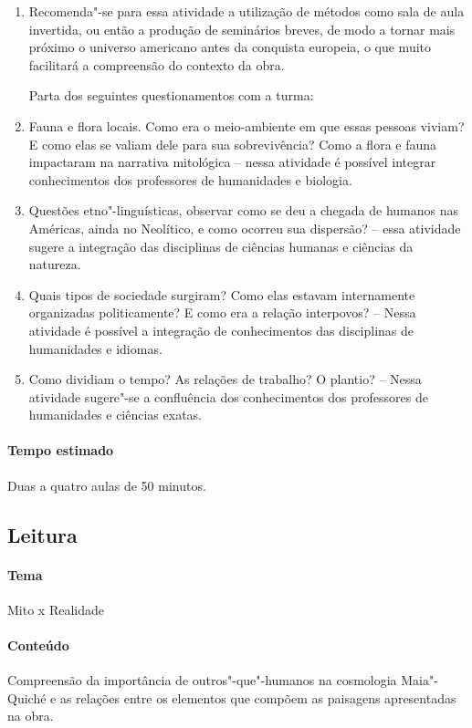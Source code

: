\documentclass[11pt]{extarticle}
\begin{document}
\begin{enumerate}
\item 
Recomenda"-se para essa atividade a utilização de métodos como sala de
aula invertida, ou então a produção de seminários breves, de modo a
tornar mais próximo o universo americano antes da conquista europeia, o
que muito facilitará a compreensão do contexto da obra.

Parta dos seguintes questionamentos com a turma:

\item
Fauna e flora locais. Como era o meio-ambiente em que essas pessoas
viviam? E como elas se valiam dele para sua sobrevivência? Como a
flora e fauna impactaram na narrativa mitológica -- nessa atividade é
possível integrar conhecimentos dos professores de humanidades e biologia.

\item
Questões etno"-linguísticas, observar como se deu a chegada de humanos
nas Américas, ainda no Neolítico, e como ocorreu sua dispersão? --
essa atividade sugere a integração das disciplinas de ciências humanas 
e ciências da natureza.
\item
Quais tipos de sociedade surgiram? Como elas estavam internamente
organizadas politicamente? E como era a relação interpovos? -- Nessa
atividade é possível a integração de conhecimentos das disciplinas de 
humanidades e idiomas.

\item
Como dividiam o tempo? As relações de trabalho? O plantio? -- Nessa 
atividade sugere"-se a confluência dos conhecimentos dos professores de 
humanidades e ciências exatas.

\end{enumerate}

\paragraph{Tempo estimado} Duas a quatro aulas de 50 minutos. 

\subsection{Leitura} 

\paragraph{Tema} Mito x Realidade

\paragraph{Conteúdo} Compreensão da importância de outros"-que"-humanos na cosmologia
Maia"-Quiché e as relações entre os elementos que compõem as paisagens apresentadas na obra. 
\end{document}
